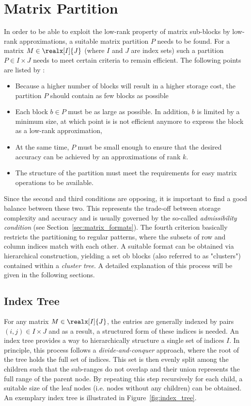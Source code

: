 \section{Matrix Partition}
\label{sec:matrix_partition}

In order to be able to exploit the low-rank property of matrix sub-blocks by low-rank approximations, a suitable matrix partition $P$ needs to be found. For a matrix $M \in \realx[I]{J}$ (where $I$ and $J$ are index sets) such a partition $P \in I \times J$ needs to meet certain criteria to remain efficient. The following points are listed by \cite{hackbusch_hierarchical_2015}:
\begin{itemize}
    \item Because a higher number of blocks will result in a higher storage cost, the partition $P$ should contain as few blocks as possible
    \item Each block $b \in P$ must be as large as possible. In addition, $b$ is limited by a minimum size, at which point is is not efficient anymore to express the block as a low-rank approximation,
    \item At the same time, $P$ must be small enough  to ensure that the desired accuracy can be achieved by an approximations of rank $k$.
    \item The structure of the partition must meet the requirements for easy matrix operations to be available.
\end{itemize}

\noindent Since the second and third conditions are opposing, it is important to find a good balance between these two. This represents the trade-off between storage complexity and accuracy and is usually governed by the so-called \textit{admissibility condition} (see Section~\hyperref[sec:matrix_formats]{\ref{sec:matrix_formats}}). 
The fourth criterion basically restricts the partitioning to regular patterns, where the subsets of row and column indices match with each other. A suitable format can be obtained via hierarchical construction, yielding a set ob blocks (also referred to as "clusters") contained within a \textit{cluster tree}. A detailed explanation of this process will be given in the following sections. 


\subsection{Index Tree}
\label{sec:index_tree}
For any matrix $M \in \realx[I]{J}$, the entries are generally indexed by pairs $(i,j) \in I \times J$ and as a result, a structured form of these indices is needed. An index tree provides a way to hierarchically structure a single set of indices $I$. In principle, this process follows a \textit{divide-and-conquer} approach, where the root of the tree holds the full set of indices. This set is then evenly split among the children such that the sub-ranges do not overlap and their union represents the full range of the parent node. By repeating this step recursively for each child, a suitable size of the leaf nodes (i.e. nodes without any children) can be obtained. An exemplary index tree is illustrated in Figure~\hyperref[fig:index_tree]{\ref{fig:index_tree}}.


